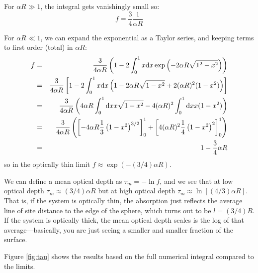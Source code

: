 \documentclass[11pt, preprint]{article}
\begin{document}
\begin{enumerate}
\begin{enumerate}
\begin{answer}
        For $\alpha R\gg 1$, the integral gets vanishingly small so:
        \begin{equation}
          f = \frac{3}{4} \frac{1}{\alpha R}
        \end{equation}
        
        For $\alpha R\ll 1$, we can expand the exponential as a Taylor
        series, and keeping terms to first order (total) in $\alpha R$:
        \begin{eqnarray}
          f
          &=& \frac{3}{4 \alpha R}
          \left(1 - 2 \int_0^1 x {\rm d}x 
              \exp\left(-2 \alpha R \sqrt{1^2 - x^2}\right)\right) \cr
          &=& \frac{3}{4 \alpha R}
          \left[1 - 2 \int_0^1 x {\rm d}x  \left( 1 - 2\alpha R
          \sqrt{1-x^2} + 2 (\alpha R)^2 (1-x^2)\right) \right]\cr
          &=& \frac{3}{4 \alpha R}
          \left( 4 \alpha R \int_0^1 {\rm d}x x \sqrt{1-x^2}
          - 4 (\alpha R)^2 \int_0^1 {\rm d}x x (1-x^2)\right) \cr
          &=& \frac{3}{4 \alpha R}
          \left( \left[- 4 \alpha R \frac{1}{3}\left(1 -
            x^2\right)^{3/2} \right]_0^1
          + \left[4 (\alpha R)^2 \frac{1}{4}\left(1 -
          x^2\right)^2\right]_0^1\right) \cr
          &=& 1 - \frac{3}{4} \alpha R
        \end{eqnarray}
        so in the optically thin limit $f\approx \exp(-(3/4) \alpha
        R)$.

        We can define a mean optical depth as $\tau_m = - \ln f$, and
        we see that at low optical depth $\tau_m \approx (3/4) \alpha
        R$ but at high optical depth $\tau_m \approx \ln[(4/3) \alpha
          R]$. That is, if the system is optically thin, the
        absorption just reflects the average line of site distance to
        the edge of the sphere, which turns out to be $l = (3/4)
        R$. If the system is optically thick, the mean optical depth
        scales is the log of that average---basically, you are just
        seeing a smaller and smaller fraction of the surface.

        Figure \ref{fig:tau} shows the results based on the full
        numerical integral compared to the limits.


\end{answer}
\end{enumerate}
\end{enumerate}
\end{document}
